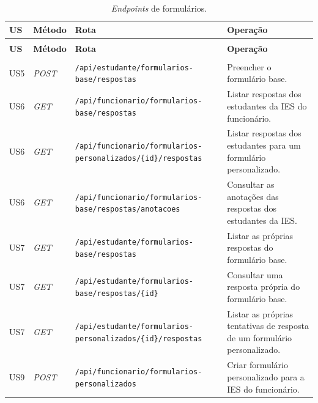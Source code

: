 \renewcommand{\arraystretch}{1.5}
\setlength{\LTleft}{\fill}
\setlength{\LTright}{\fill}
\begin{longtable}{|>{\centering\arraybackslash}p{1.2cm}|>{\centering\arraybackslash}p{1.7cm}|>{\raggedright\arraybackslash}p{5.7cm}|>{\raggedright\arraybackslash}p{5.2cm}|}
\caption{\textit{Endpoints} de formulários.}\label{tab:endpoints-formularios}\\
\hline
\textbf{US} & \textbf{Método} & \textbf{Rota} & \textbf{Operação} \\
\hline
\endfirsthead
\multicolumn{4}{c}{\tablename\ \thetable{} -- continuação}\\
\hline
\textbf{US} & \textbf{Método} & \textbf{Rota} & \textbf{Operação} \\
\hline
\endhead
\hline
\endfoot
\hline
\multicolumn{4}{c}{\small Fonte: autoria própria.}\\
\endlastfoot
US5 & \textit{POST} & \texttt{/api/\allowbreak estudante/\allowbreak formularios-base/\allowbreak respostas} & Preencher o formulário base. \\
\hline
US6 & \textit{GET} & \texttt{/api/\allowbreak funcionario/\allowbreak formularios-base/\allowbreak respostas} & Listar respostas dos estudantes da IES do funcionário. \\
\hline
US6 & \textit{GET} & \texttt{/api/\allowbreak funcionario/\allowbreak formularios-personalizados/\allowbreak \{id\}/\allowbreak respostas} & Listar respostas dos estudantes para um formulário personalizado. \\
\hline
US6 & \textit{GET} & \texttt{/api/\allowbreak funcionario/\allowbreak formularios-base/\allowbreak respostas/\allowbreak anotacoes} & Consultar as anotações das respostas dos estudantes da IES. \\
\hline
US7 & \textit{GET} & \texttt{/api/\allowbreak estudante/\allowbreak formularios-base/\allowbreak respostas} & Listar as próprias respostas do formulário base. \\
\hline
US7 & \textit{GET} & \texttt{/api/\allowbreak estudante/\allowbreak formularios-base/\allowbreak respostas/\allowbreak \{id\}} & Consultar uma resposta própria do formulário base. \\
\hline
US7 & \textit{GET} & \texttt{/api/\allowbreak estudante/\allowbreak formularios-personalizados/\allowbreak \{id\}/\allowbreak respostas} & Listar as próprias tentativas de resposta de um formulário personalizado. \\
\hline
US9 & \textit{POST} & \texttt{/api/\allowbreak funcionario/\allowbreak formularios-personalizados} & Criar formulário personalizado para a IES do funcionário. \\

\end{longtable}
